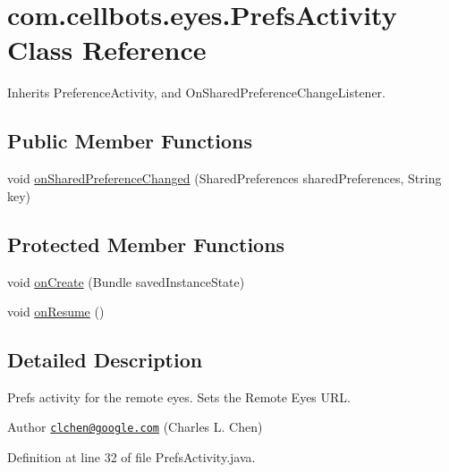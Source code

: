 \hypertarget{classcom_1_1cellbots_1_1eyes_1_1_prefs_activity}{\section{com.\-cellbots.\-eyes.\-Prefs\-Activity Class Reference}
\label{classcom_1_1cellbots_1_1eyes_1_1_prefs_activity}
}


Inherits Preference\-Activity, and On\-Shared\-Preference\-Change\-Listener.

\subsection*{Public Member Functions}
\begin{DoxyCompactItemize}
\item 
void \hyperlink{classcom_1_1cellbots_1_1eyes_1_1_prefs_activity_acdcbcb106835b6714eb4e3f0073a1ee9}{on\-Shared\-Preference\-Changed} (Shared\-Preferences shared\-Preferences, String key)
\end{DoxyCompactItemize}
\subsection*{Protected Member Functions}
\begin{DoxyCompactItemize}
\item 
void \hyperlink{classcom_1_1cellbots_1_1eyes_1_1_prefs_activity_ae26f1ed801590eeb485025ec24d0262d}{on\-Create} (Bundle saved\-Instance\-State)
\item 
void \hyperlink{classcom_1_1cellbots_1_1eyes_1_1_prefs_activity_a2371086cd4bf4e8d44940341996c988c}{on\-Resume} ()
\end{DoxyCompactItemize}


\subsection{Detailed Description}
Prefs activity for the remote eyes. Sets the Remote Eyes U\-R\-L.

\begin{DoxyAuthor}{Author}
\href{mailto:clchen@google.com}{\tt clchen@google.\-com} (Charles L. Chen) 
\end{DoxyAuthor}


Definition at line 32 of file Prefs\-Activity.\-java.



